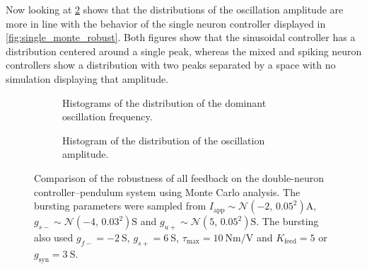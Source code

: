 Now looking at \cref{fig:double_monte_range_zoom} shows that the distributions of the oscillation amplitude are more in line with the behavior of the single neuron controller displayed in \cref{fig:single_monte_robust}.
Both figures show that the sinusoidal controller has a distribution centered around a single peak, whereas the mixed and spiking neuron controllers show a distribution with two peaks separated by a space with no simulation displaying that amplitude.


\begin{figure}[!htbp]
    \centering
    \begin{subfigure}[b]{\textwidth}
        \centering
        \caption{Histograms of the distribution of the dominant oscillation frequency.}
        \label{fig:double_monte_freq_zoom}
    \end{subfigure}
    
    \begin{subfigure}[b]{\textwidth}
        \centering
        \caption{Histogram of the distribution of the oscillation amplitude.}
        \label{fig:double_monte_range_zoom}
    \end{subfigure}
    \caption{Comparison of the robustness of all feedback on the double-neuron controller–pendulum system using Monte Carlo analysis. The bursting parameters were sampled from $I_\text{app} \sim \mathcal{N}\left(-2,\, 0.05^2\right) \unit{\ampere}$, $g_{s-} \sim \mathcal{N}\left(-4,\, 0.03^2\right) \unit{\siemens}$ and $g_{u+} \sim \mathcal{N}\left(5,\, 0.05^2\right) \unit{\siemens}$. The bursting also used $g_{f-} = \qty{-2}{\siemens}$, $g_{s+} = \qty{6}{\siemens}$, $\tau_\text{max} = \qty{10}{\newton\meter\per\volt}$ and $K_\text{feed} = 5$ or $g_{\text{syn}} = \qty{3}{\siemens}$.}
    \label{fig:double_monte_zoom}
\end{figure}



